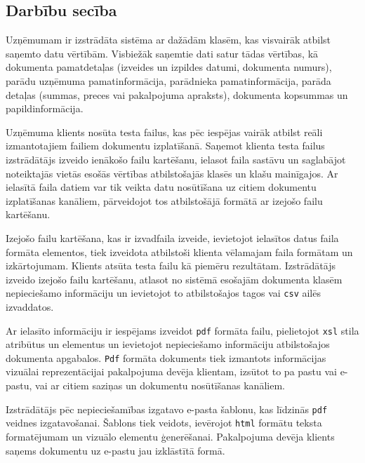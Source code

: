 \subsection{Darbību secība}
\par Uzņēmumam ir izstrādāta sistēma ar dažādām klasēm, kas visvairāk atbilst saņemto datu vērtībām. Visbiežāk saņemtie dati satur tādas vērtības, kā dokumenta pamatdetaļas (izveides un izpildes datumi, dokumenta numurs), parādu uzņēmuma pamatinformācija, parādnieka pamatinformācija, parāda detaļas (summas, preces vai pakalpojuma apraksts), dokumenta kopsummas un papildinformācija.
\par Uzņēmuma klients nosūta testa failus, kas pēc iespējas vairāk atbilst reāli izmantotajiem failiem dokumentu izplatīšanā. Saņemot klienta testa failus izstrādātājs izveido ienākošo failu kartēšanu, ielasot faila sastāvu un saglabājot noteiktajās vietās esošās vērtības atbilstošajās klasēs un klašu mainīgajos. Ar ielasītā faila datiem var tik veikta datu nosūtīšana uz citiem dokumentu izplatīšanas kanāliem, pārveidojot tos atbilstošājā formātā ar izejošo failu kartēšanu.
\par Izejošo failu kartēšana, kas ir izvadfaila izveide, ievietojot ielasītos datus faila formāta elementos, tiek izveidota atbilstoši klienta vēlamajam faila formātam un izkārtojumam. Klients atsūta testa failu kā piemēru rezultātam. Izstrādātājs izveido izejošo failu kartēšanu, atlasot no sistēmā esošajām dokumenta klasēm nepieciešamo informāciju un ievietojot to atbilstošajos tagos vai \texttt{csv} ailēs izvaddatos.
\par Ar ielasīto informāciju ir iespējams izveidot \texttt{pdf} formāta failu, pielietojot \texttt{xsl} stila atribūtus un elementus un ievietojot nepieciešamo informāciju atbilstošajos dokumenta apgabalos. \texttt{Pdf} formāta dokuments tiek izmantots informācijas vizuālai reprezentācijai pakalpojuma devēja klientam, izsūtot to pa pastu vai e-pastu, vai ar citiem saziņas un dokumentu nosūtīšanas kanāliem.
\par Izstrādātājs pēc nepieciešamības izgatavo e-pasta šablonu, kas līdzinās \texttt{pdf} veidnes izgatavošanai. Šablons tiek veidots, ievērojot \texttt{html} formātu teksta formatējumam un vizuālo elementu ģenerēšanai. Pakalpojuma devēja klients saņems dokumentu uz e-pastu jau izklāstītā formā.



